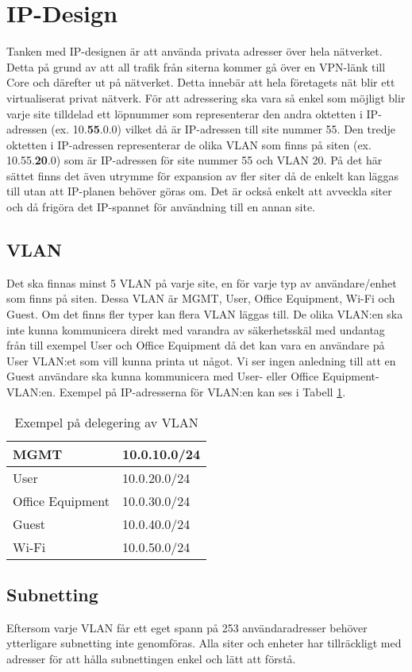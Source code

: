 \section{IP-Design}
    Tanken med IP-designen är att använda privata adresser över hela nätverket. Detta på grund av att all trafik från siterna kommer gå över en VPN-länk till Core och därefter ut på nätverket. Detta innebär att hela företagets nät blir ett virtualiserat privat nätverk. För att adressering ska vara så enkel som möjligt blir varje site tilldelad ett löpnummer som representerar den andra oktetten i IP-adressen (ex. 10.\textbf{55}.0.0) vilket då är IP-adressen till site nummer 55. Den tredje oktetten i IP-adressen representerar de olika VLAN som finns på siten (ex. 10.55.\textbf{20}.0) som är IP-adressen för site nummer 55 och VLAN 20. På det här sättet finns det även utrymme för expansion av fler siter då de enkelt kan läggas till utan att IP-planen behöver göras om. Det är också enkelt att avveckla siter och då frigöra det IP-spannet för användning till en annan site.

\subsection{VLAN}
    Det ska finnas minst 5 VLAN på varje site, en för varje typ av användare/enhet som finns på siten. Dessa VLAN är MGMT, User, Office Equipment, Wi-Fi och Guest. Om det finns fler typer kan flera VLAN läggas till. De olika VLAN:en ska inte kunna kommunicera direkt med varandra av säkerhetsskäl med undantag från till exempel User och Office Equipment då det kan vara en användare på User VLAN:et som vill kunna printa ut något. Vi ser ingen anledning till att en Guest användare ska kunna kommunicera med User- eller Office Equipment-VLAN:en. Exempel på IP-adresserna för VLAN:en kan ses i Tabell \ref{table:ip-plan}.

    \begin{table}[htb]
        \centering
        \caption{Exempel på delegering av VLAN}
        \begin{tabular}{|l|l|}
            \hline
            MGMT 				& 10.0.10.0/24 \\ \hline
            User 				& 10.0.20.0/24 \\ \hline
            Office Equipment 	& 10.0.30.0/24 \\ \hline
            Guest 				& 10.0.40.0/24 \\ \hline
            Wi-Fi 				& 10.0.50.0/24 \\ \hline
        \end{tabular}
        \label{table:ip-plan}
    \end{table}

\subsection{Subnetting}
    Eftersom varje VLAN får ett eget spann på 253 användaradresser behöver ytterligare subnetting inte genomföras. Alla siter och enheter har tillräckligt med adresser för att hålla subnettingen enkel och lätt att förstå.